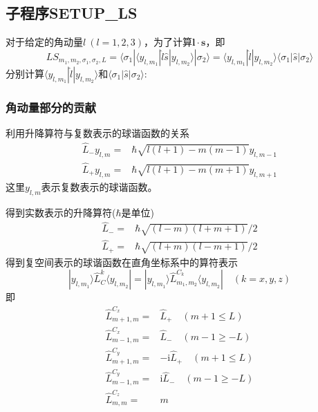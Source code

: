 \documentclass[10pt, oneside, a4paper]{article}      %
\begin{document}
\subsection{子程序\bf{SETUP\_LS}}
对于给定的角动量$l~(l=1,2,3)$，为了计算$\mathbf{l}\cdot\mathbf{s}$，即
\begin{displaymath}
	LS_{m_1,m_2,\sigma_1,\sigma_2,L}=\langle\sigma_1|\langle y_{l,m_1}|\hat l\hat s|y_{l,m_2}\rangle|\sigma_2\rangle=\langle y_{l,m_1}|\hat l|y_{l,m_2}\rangle\langle\sigma_1|\hat s|\sigma_2\rangle
\end{displaymath}
分别计算$\langle y_{l,m_1}|\hat l|y_{l,m_2}\rangle$和$\langle\sigma_1|\hat s|\sigma_2\rangle$:
\subsubsection{角动量部分的贡献}
利用升降算符与复数表示的球谐函数的关系
\begin{displaymath}
	\begin{aligned}
		\hat{L}_-y_{l,m}=&\hbar\sqrt{l(l+1)-m(m-1)}y_{l,m-1}\\
		\hat{L}_+y_{l,m}=&\hbar\sqrt{l(l+1)-m(m+1)}y_{l,m+1}
	\end{aligned}
\end{displaymath}
这里$y_{l,m}$表示复数表示的球谐函数。

得到实数表示的升降算符($\hbar$是单位)
\begin{displaymath}
	\begin{aligned}
		\hat{L}_-=&\hbar\sqrt{(l-m)(l+m+1)}/2\\
		\hat{L}_+=&\hbar\sqrt{(l+m)(l-m+1)}/2
	\end{aligned}
\end{displaymath}
得到复空间表示的球谐函数在直角坐标系中的算符表示
\begin{displaymath}
	|y_{l,m_1}\rangle\hat{L}_C^{k}\langle y_{l,m_2}|=|y_{l,m_1}\rangle\hat{L}_{m_1,m_2}^{C_k}\langle y_{l,m_2}| \quad (k=x,y,z)
\end{displaymath}
即
\begin{displaymath}
	\begin{aligned}
		\hat{L}_{m+1,m}^{C_x} =& \hat{L}_+ \quad (m+1\leqslant L)\\
		\hat{L}_{m-1,m}^{C_x} =& \hat{L}_- \quad (m-1\geqslant -L)\\
		\hat{L}_{m+1,m}^{C_y} =& -\mathrm{i}\hat{L}_+ \quad (m+1\leqslant L)\\
		\hat{L}_{m-1,m}^{C_y} =& \mathrm{i}\hat{L}_- \quad (m-1\geqslant -L)\\
		\hat{L}_{m,m}^{C_z} =& m
	\end{aligned}
\end{displaymath}
\end{document}
